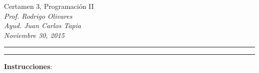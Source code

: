 \documentclass[10pt]{article}
\begin{document}
    \begin{center}
		{\Large Certamen 3, Programaci\'on II} \\
		\emph{\small Prof. Rodrigo Olivares} \\
		\emph{\small Ayud. Juan Carlos Tapia} \\
		\emph{\scriptsize Noviembre 30, 2015} 
	\end{center}

	\vspace*{-35pt}
	\begin{center}
		\rule{1\textwidth}{.3pt}
	\end{center}
	\vspace*{-42pt}
	\begin{center}
		\rule{1\textwidth}{2pt}
	\end{center}

	\vspace*{-15pt}

	{\small \textbf{Instrucciones}:}

	\vspace*{-15pt}
\end{document}
